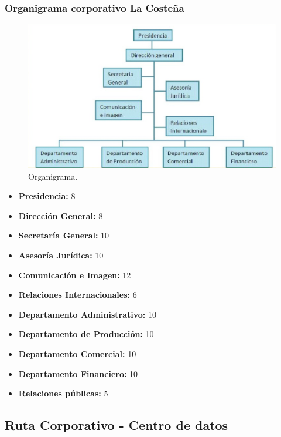 \documentclass[12pt,letterpaper]{article}
\begin{document}
\newpage
\subsubsection{Organigrama corporativo La Costeña}
\begin{figure}[ht]
    \centering
    \includegraphics[width=.9\textwidth]{imagenes/organigrama.png}
    \caption{Organigrama. \cite{costenaorganigrama}}
\end{figure}
\begin{itemize}
    \item \textbf{Presidencia: }8
    \item \textbf{Dirección General: }8
    \item \textbf{Secretaría General: }10
    \item \textbf{Asesoría Jurídica: }10
    \item \textbf{Comunicación e Imagen: }12
    \item \textbf{Relaciones Internacionales: }6
    \item \textbf{Departamento Administrativo: }10
    \item \textbf{Departamento de Producción: }10
    \item \textbf{Departamento Comercial: }10
    \item \textbf{Departamento Financiero: }10
    \item \textbf{Relaciones públicas: }5
\end{itemize}

\newpage
\subsection{Ruta Corporativo - Centro de datos }
\end{document}
